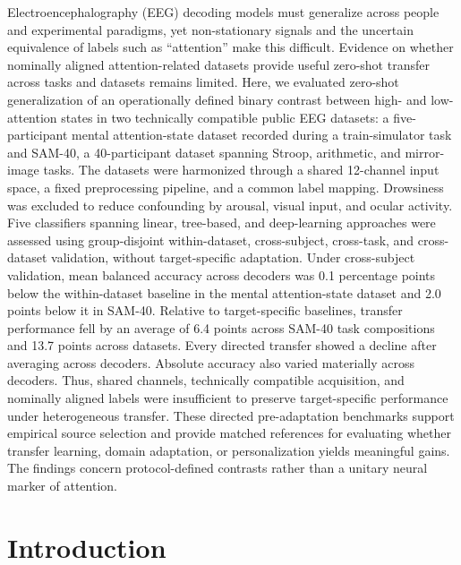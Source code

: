 \documentclass[10pt,letterpaper]{article}
\begin{document}
Electroencephalography (EEG) decoding models must generalize across people and experimental paradigms, yet non-stationary signals and the uncertain equivalence of labels such as ``attention'' make this difficult. Evidence on whether nominally aligned attention-related datasets provide useful zero-shot transfer across tasks and datasets remains limited. Here, we evaluated zero-shot generalization of an operationally defined binary contrast between high- and low-attention states in two technically compatible public EEG datasets: a five-participant mental attention-state dataset recorded during a train-simulator task and SAM-40, a 40-participant dataset spanning Stroop, arithmetic, and mirror-image tasks. The datasets were harmonized through a shared 12-channel input space, a fixed preprocessing pipeline, and a common label mapping. Drowsiness was excluded to reduce confounding by arousal, visual input, and ocular activity. Five classifiers spanning linear, tree-based, and deep-learning approaches were assessed using group-disjoint within-dataset, cross-subject, cross-task, and cross-dataset validation, without target-specific adaptation. Under cross-subject validation, mean balanced accuracy across decoders was 0.1 percentage points below the within-dataset baseline in the mental attention-state dataset and 2.0 points below it in SAM-40. Relative to target-specific baselines, transfer performance fell by an average of 6.4 points across SAM-40 task compositions and 13.7 points across datasets. Every directed transfer showed a decline after averaging across decoders. Absolute accuracy also varied materially across decoders. Thus, shared channels, technically compatible acquisition, and nominally aligned labels were insufficient to preserve target-specific performance under heterogeneous transfer. These directed pre-adaptation benchmarks support empirical source selection and provide matched references for evaluating whether transfer learning, domain adaptation, or personalization yields meaningful gains. The findings concern protocol-defined contrasts rather than a unitary neural marker of attention.

\clearpage
{}
\linenumbers

\section*{Introduction}
\end{document}
